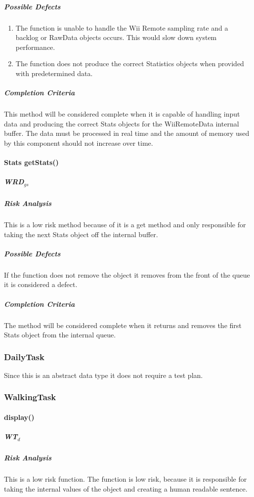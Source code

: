 \documentclass{article}
\begin{document}
\subparagraph{Possible Defects}
\begin{enumerate}
\item The function is unable to handle the Wii Remote sampling rate and a backlog or RawData objects occurs. This would slow down system performance.
\item The function does not produce the correct Statistics objects when provided with predetermined data. 
\end{enumerate}
\subparagraph{Completion Criteria}
This method will be considered complete when it is capable of handling input data and producing the correct Stats objects for the WiiRemoteData internal buffer.  The data must be processed in real time and the amount of memory used by this component should not increase over time.

\paragraph{Stats getStats()}
\subparagraph{WRD$_{gs}$}

\subparagraph{Risk Analysis}
This is a low risk method because of it is a get method and only responsible for taking the next Stats object off the internal buffer.

\subparagraph{Possible Defects}
If the function does not remove the object it removes from the front of the queue it is considered a defect.

\subparagraph{Completion Criteria}
The method will be considered complete when it returns and removes the first Stats object from the internal queue.


\subsubsection{DailyTask}
Since this is an abstract data type it does not require a test plan.

\subsubsection{WalkingTask}

\paragraph{display()}
\subparagraph{WT$_{d}$}

\subparagraph{Risk Analysis}
This is a low risk function. The function is low risk, because it is responsible for taking the internal values of the object and creating a human readable sentence.
\end{document}
